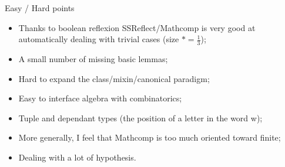 \documentclass[compress,11pt]{beamer}
\begin{document}
\begin{frame}{Easy / Hard points}

  \begin{itemize}
  \item Thanks to boolean reflexion SSReflect/Mathcomp is very good at
    automatically dealing with trivial cases (size $*=\frac{1}{3}$); \medskip

  \item A small number of missing basic lemmas;
    \pause

  \item Hard to expand the class/mixin/canonical paradigm;
    \medskip

  \item Easy to interface algebra with combinatorics;

  \item Tuple and dependant types (the position of a letter in the word w);
    \medskip

  \item More generally, I feel that Mathcomp is too much oriented toward
    finite;
    \medskip

  \item Dealing with a lot of hypothesis.
  \end{itemize}
  
\end{frame}
\end{document}
